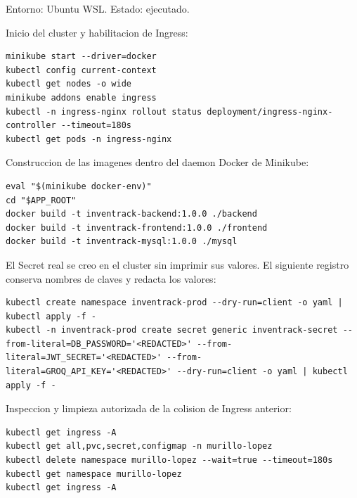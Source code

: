 Entorno: Ubuntu WSL. Estado: ejecutado.

Inicio del cluster y habilitacion de Ingress:

\begin{tcolorbox}[codebox]
\begin{Verbatim}[fontsize=\scriptsize,breaklines=true,breakanywhere=true]
minikube start --driver=docker
kubectl config current-context
kubectl get nodes -o wide
minikube addons enable ingress
kubectl -n ingress-nginx rollout status deployment/ingress-nginx-controller --timeout=180s
kubectl get pods -n ingress-nginx
\end{Verbatim}
\end{tcolorbox}

Construccion de las imagenes dentro del daemon Docker de Minikube:

\begin{tcolorbox}[codebox]
\begin{Verbatim}[fontsize=\scriptsize,breaklines=true,breakanywhere=true]
eval "$(minikube docker-env)"
cd "$APP_ROOT"
docker build -t inventrack-backend:1.0.0 ./backend
docker build -t inventrack-frontend:1.0.0 ./frontend
docker build -t inventrack-mysql:1.0.0 ./mysql
\end{Verbatim}
\end{tcolorbox}

El Secret real se creo en el cluster sin imprimir sus valores. El siguiente registro conserva nombres de claves y redacta los valores:

\begin{tcolorbox}[codebox]
\begin{Verbatim}[fontsize=\scriptsize,breaklines=true,breakanywhere=true]
kubectl create namespace inventrack-prod --dry-run=client -o yaml | kubectl apply -f -
kubectl -n inventrack-prod create secret generic inventrack-secret --from-literal=DB_PASSWORD='<REDACTED>' --from-literal=JWT_SECRET='<REDACTED>' --from-literal=GROQ_API_KEY='<REDACTED>' --dry-run=client -o yaml | kubectl apply -f -
\end{Verbatim}
\end{tcolorbox}

Inspeccion y limpieza autorizada de la colision de Ingress anterior:

\begin{tcolorbox}[codebox]
\begin{Verbatim}[fontsize=\scriptsize,breaklines=true,breakanywhere=true]
kubectl get ingress -A
kubectl get all,pvc,secret,configmap -n murillo-lopez
kubectl delete namespace murillo-lopez --wait=true --timeout=180s
kubectl get namespace murillo-lopez
kubectl get ingress -A
\end{Verbatim}
\end{tcolorbox}

